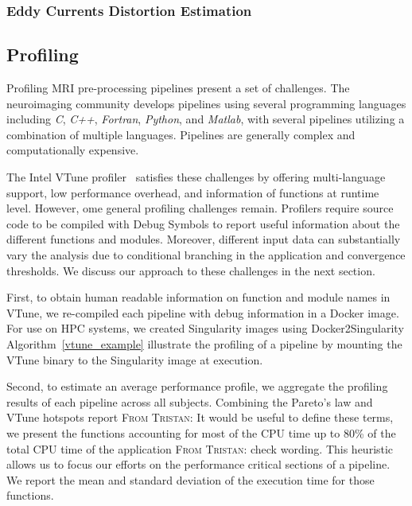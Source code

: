 \documentclass[conference]{IEEEtran}
\renewcommand{\lstlistingname}{Algorithm}
\newcommand{\TG}[1]{\color{blue}\textsc{From Tristan: }#1\color{black}}
\begin{document}
\subsubsection{Eddy Currents Distortion Estimation}


\subsection{Profiling}
Profiling MRI pre-processing pipelines present a set of challenges. The neuroimaging community develops pipelines using several programming languages including \textit{C}, \textit{C++}, \textit{Fortran}, \textit{Python}, and \textit{Matlab}, with several pipelines utilizing a combination of multiple languages. Pipelines are generally complex and computationally expensive.

The Intel VTune profiler~\cite{vtune_profiler} satisfies these challenges by offering multi-language support, low performance overhead, and information of functions at runtime level. However, ome general profiling challenges remain. Profilers require source code to be compiled with Debug Symbols to report useful information about the different functions and modules. Moreover, different input data can substantially vary the analysis due to conditional branching in the application and convergence thresholds. We discuss our approach to these challenges in the next section.

First, to obtain human readable information on function and module names in VTune, we re-compiled each pipeline with debug information in a Docker image. For use on HPC systems, we created Singularity images using Docker2Singularity \lstlistingname~\ref{vtune_example} illustrate the profiling of a pipeline by mounting the VTune binary to the Singularity image at execution.


Second, to estimate an average performance profile, we aggregate the profiling results of each pipeline across all subjects. Combining the Pareto's law and VTune hotspots report \TG{It would be useful to define these terms}, we present the functions accounting for most of the CPU time up to 80\% of the total CPU time of the application \TG{check wording}. This heuristic allows us to focus our efforts on the performance critical sections of a pipeline. We report the mean and standard deviation of the execution time for those functions.
\end{document}
